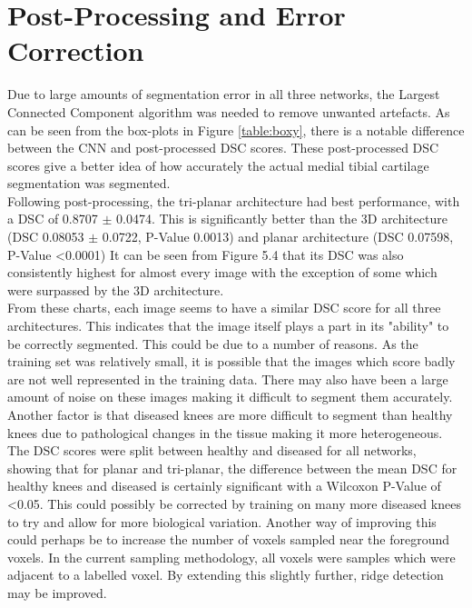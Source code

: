 \documentclass[11pt,a4paper]{memoir}
\numberwithin{figure}{section}
\numberwithin{table}{section}
\numberwithin{equation}{section}
\begin{document}
\section{Post-Processing and Error Correction}

Due to large amounts of segmentation error in all three networks, the Largest Connected Component algorithm was needed to remove unwanted artefacts. As can be seen from the box-plots in Figure \ref{table:boxy}, there is a notable difference between the CNN and post-processed DSC scores. These post-processed DSC scores give a better idea of how accurately the actual medial tibial cartilage segmentation was segmented. \\

Following post-processing, the tri-planar architecture had best performance, with a DSC of 0.8707 $\pm$ 0.0474. This is significantly better than the 3D architecture (DSC 0.08053 $\pm$ 0.0722, P-Value 0.0013) and planar architecture (DSC 0.07598, P-Value \textless 0.0001) It can be seen from Figure 5.4 that its DSC was also consistently highest for almost every image with the exception of some which were surpassed by the 3D architecture. \\

From these charts, each image seems to have a similar DSC score for all three architectures. This indicates that the image itself plays a part in its "ability" to be correctly segmented. This could be due to a number of reasons. As the training set was relatively small, it is possible that the images which score badly are not well represented in the training data. There may also have been a large amount of noise on these images making it difficult to segment them accurately.  \\

Another factor is that diseased knees are more difficult to segment than healthy knees due to pathological changes in the tissue making it more heterogeneous. The DSC scores were split between healthy and diseased for all networks, showing that for planar and tri-planar, the difference between the mean DSC for healthy knees and diseased is certainly significant with a Wilcoxon P-Value of \textless 0.05. This could possibly be corrected by training on many more diseased knees to try and allow for more biological variation. Another way of improving this could perhaps be to increase the number of voxels sampled near the foreground voxels. In the current sampling methodology, all voxels were samples which were adjacent to a labelled voxel. By extending this slightly further, ridge detection may be improved. \\
\end{document}
